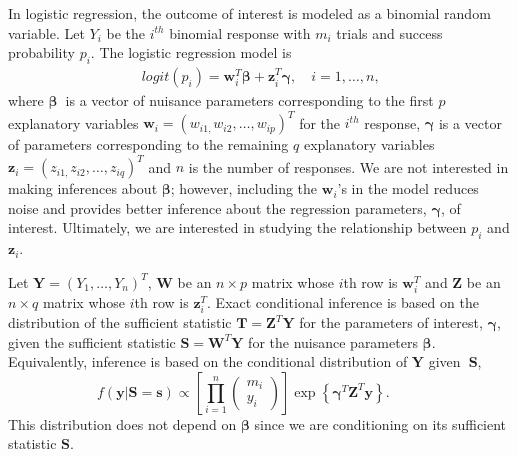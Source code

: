 \documentclass[article, shortnames]{jss}
\begin{document}
In logistic regression, the outcome of interest is modeled as a
binomial random variable. Let $Y_{i}$ be the $i^{th}$ binomial response
with $m_i$ trials and success probability $p_i$. The logistic regression
model is
\begin{equation*}
\begin{array}{l}
logit\left(
p_{i}\right) =\mathbf{w}_{i}^{T}\mathbf{\beta +z}_{i}^{T}\mathbf{\gamma }%
,\quad i=1,\ldots ,n\text{,}%
\end{array}%
\end{equation*}%
where $\mathbf{\beta }$\textbf{\ }is a vector of nuisance parameters
corresponding to the first $p$ explanatory variables
$\mathbf{w}_i=\left( w_{i1,}w_{i2},\ldots ,w_{ip}\right) ^{T}$
for the $i^{th}$ response,
$\mathbf{\gamma }$ is a vector of parameters corresponding to the
remaining $q$ explanatory variables $\mathbf{z}_i=\left(
z_{i1,}z_{i2},\ldots ,z_{iq}\right) ^{T}$ and $n$ is the number of
responses. We are not
interested in making inferences about $\mathbf{\beta }$; however,
including the $\mathbf{w}_{i}$'s in the model reduces noise and
provides better inference about the regression parameters,
$\mathbf{\gamma }$, of interest.
Ultimately, we are interested in
studying the relationship between $p_i$ and $\mathbf{z}_i$.

Let $\mathbf{Y}=(Y_1,\ldots,Y_n)^T$,
$\mathbf{W}$ be an $n\times p$ matrix whose $i$th row is
$\mathbf{w}^T_i$ and
$\mathbf{Z}$ be an $n\times q$ matrix whose $i$th row is
$\mathbf{z}^T_i$.
Exact conditional inference is based on the distribution of the sufficient
statistic $\mathbf{T}=\mathbf{Z}^T \mathbf{Y}$
for the parameters of interest, $\mathbf{\gamma }$,
given the sufficient statistic $\mathbf{S}=\mathbf{W}^{T}\mathbf{Y}$
for the nuisance parameters $\mathbf{\beta }$.
Equivalently, inference is based on the
conditional distribution of $\mathbf{Y}$ given\textbf{\
}$\mathbf{S}$,
\begin{equation}
f\left( \mathbf{y}|\mathbf{S=s}\right) \varpropto \left[ \prod%
\limits_{i=1}^{n}%
\begin{pmatrix}
m_{i} \\
y_{i}%
\end{pmatrix}%
\right] \exp \left\{ \mathbf{\gamma }^{T}\mathbf{Z}^{T}\mathbf{y}\right\}
\text{.}\hspace{1cm}  \label{y given s}
\end{equation}
This distribution does not
depend on $\mathbf{\beta }$ since we are conditioning on its sufficient
statistic $\mathbf{S}$.
\end{document}

